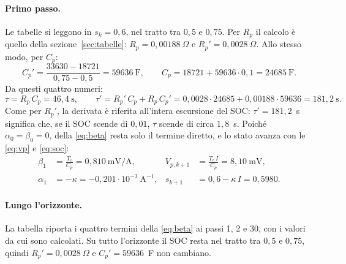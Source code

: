 \documentclass[11pt,a4paper]{article}
\newcommand{\Tc}{T_c}
\begin{document}
\paragraph{Primo passo.} Le tabelle si leggono in $s_k = 0{,}6$, nel tratto
tra $0{,}5$ e $0{,}75$. Per $R_p$ il calcolo è quello della
sezione~\ref{sec:tabelle}: $R_p = 0{,}00188~\Omega$ e
$R_p' = 0{,}0028~\Omega$. Allo stesso modo, per $C_p$:
\[
  C_p' = \frac{33630 - 18721}{0{,}75 - 0{,}5} = 59636~\mathrm{F} ,
  \qquad
  C_p = 18721 + 59636 \cdot 0{,}1 = 24685~\mathrm{F} .
\]
Da questi quattro numeri:
\[
  \tau = R_p\,C_p = 46{,}4~\mathrm{s} ,
  \qquad
  \tau' = R_p'\,C_p + R_p\,C_p'
        = 0{,}0028 \cdot 24685 + 0{,}00188 \cdot 59636
        = 181{,}2~\mathrm{s} .
\]
Come per $R_p'$, la derivata è riferita all'intera escursione del SOC:
$\tau' = 181{,}2$~s significa che, se il SOC scende di $0{,}01$, $\tau$ scende
di circa $1{,}8$~s. Poiché $\alpha_0 = \beta_0 = 0$, della \eqref{eq:beta}
resta solo il termine diretto, e lo stato avanza con le \eqref{eq:vp} e
\eqref{eq:soc}:
\begin{align*}
  \beta_1 &= \frac{\Tc}{C_p} = 0{,}810~\mathrm{mV/A} ,
  & V_{p,k+1} &= \frac{\Tc\,I}{C_p} = 8{,}10~\mathrm{mV} , \\[2pt]
  \alpha_1 &= -\kappa = -0{,}201 \cdot 10^{-3}~\mathrm{A}^{-1} ,
  & s_{k+1} &= 0{,}6 - \kappa\,I = 0{,}5980 .
\end{align*}

\paragraph{Lungo l'orizzonte.} La tabella riporta i quattro termini della
\eqref{eq:beta} ai passi 1, 2 e 30, con i valori da cui sono calcolati. Su
tutto l'orizzonte il SOC resta nel tratto tra $0{,}5$ e $0{,}75$, quindi
$R_p' = 0{,}0028~\Omega$ e $C_p' = 59636$~F non cambiano.
\end{document}
